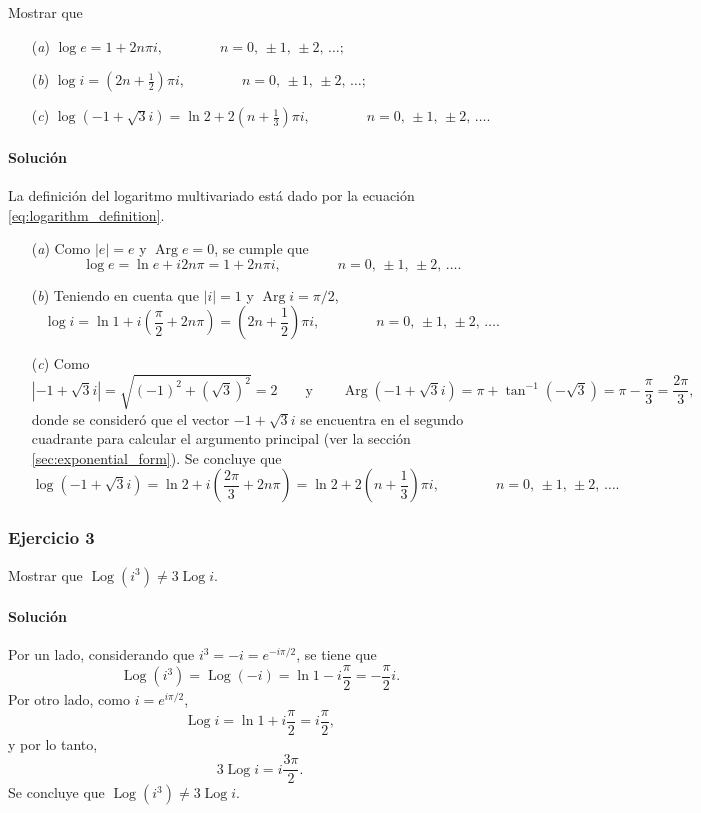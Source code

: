 \documentclass[a4paper]{report}
\DeclareMathOperator{\Arg}{Arg}
\DeclareMathOperator{\Log}{Log}
\begin{document}
Mostrar que  
\begin{enumerate}
 \item[(\textit{a})] \(\displaystyle\log e=1+2n\pi i,\qquad\qquad n=0,\,\pm1,\,\pm2,\,\dots;\)
 \item[(\textit{b})] \(\displaystyle\log i=\left(2n+\frac{1}{2}\right)\pi i,\qquad\qquad n=0,\,\pm1,\,\pm2,\,\dots;\)
 \item[(\textit{c})] \(\displaystyle\log(-1+\sqrt{3}i)=\ln2+2\left(n+\frac{1}{3}\right)\pi i,\qquad\qquad n=0,\,\pm1,\,\pm2,\,\dots\).
\end{enumerate}

\paragraph{Solución} La definición del logaritmo multivariado está dado por la ecuación \ref{eq:logarithm_definition}.

\begin{enumerate}
 \item[(\textit{a})] Como \(|e|=e\) y \(\Arg e=0\), se cumple que 
 \[
  \displaystyle\log e=\ln e+i2n\pi=1+2n\pi i,\qquad\qquad n=0,\,\pm1,\,\pm2,\,\dots.
 \]
 \item[(\textit{b})] Teniendo en cuenta que \(|i|=1\) y \(\Arg i=\pi/2\),
 \[
  \log i=\ln1+i\left(\frac{\pi}{2}+2n\pi\right)=\left(2n+\frac{1}{2}\right)\pi i,\qquad\qquad n=0,\,\pm1,\,\pm2,\,\dots.
 \]
 \item[(\textit{c})] Como
 \[
  |-1+\sqrt{3}i|=\sqrt{(-1)^2+(\sqrt{3})^2}=2
  \qquad\textrm{y}\qquad 
  \Arg(-1+\sqrt{3}i)=\pi+\tan^{-1}(-\sqrt{3})=\pi-\frac{\pi}{3}=\frac{2\pi}{3},
 \]
 donde se consideró que el vector \(-1+\sqrt{3}i\) se encuentra en el segundo cuadrante para calcular el argumento principal (ver la sección \ref{sec:exponential_form}). Se concluye que
 \[
  \log(-1+\sqrt{3}i)=\ln2+i\left(\frac{2\pi}{3}+2n\pi\right)=\ln2+2\left(n+\frac{1}{3}\right)\pi i,\qquad\qquad n=0,\,\pm1,\,\pm2,\,\dots.
 \]
\end{enumerate}

\subsubsection{Ejercicio 3}

Mostrar que \(\Log(i^3)\neq3\Log i\).

\paragraph{Solución} Por un lado, considerando que \(i^3=-i=e^{-i\pi/2}\), se tiene que 
\[
 \Log(i^3)=\Log(-i)=\ln1-i\frac{\pi}{2}=-\frac{\pi}{2}i.
\]
Por otro lado, como \(i=e^{i\pi/2}\),
\[
 \Log i=\ln1+i\frac{\pi}{2}=i\frac{\pi}{2},
\]
y por lo tanto,
\[
 3\Log i=i\frac{3\pi}{2}.
\]
Se concluye que \(\Log(i^3)\neq3\Log i\).
\end{document}
